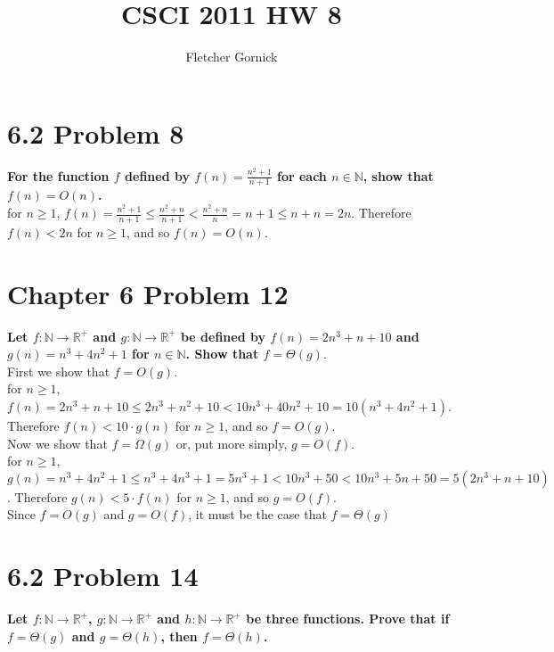 \documentclass[10pt]{article}
\title{CSCI 2011 HW 8}
\author{Fletcher Gornick}
\begin{document}
\maketitle


\section{6.2 Problem 8}
\textbf{For the function $f$ defined by $f(n) = \frac{n^2+1}{n+1}$ for each $n \in \mathbb{N}$, show that $f(n) = O(n)$.} \\

for $n \geq 1$,
$f(n) = \frac{n^2+1}{n+1} \leq \frac{n^2+n}{n+1} < \frac{n^2+n}{n} = n + 1 \leq n + n = 2n$.  Therefore $f(n) < 2n$ for $n \geq 1$, and so $f(n) = O(n)$.



\section{Chapter 6 Problem 12}
\textbf{Let $f: \mathbb{N} \to \mathbb{R}^+$ and $g: \mathbb{N} \to \mathbb{R}^+$ be defined by $f(n) = 2n^3 + n + 10$ and $g(n) = n^3 + 4n^2 + 1$
for $n \in \mathbb{N}$.  Show that $f = \Theta(g)$}. \\

First we show that $f = O(g)$. \\
for $n \geq 1$, $f(n) = 2n^3 + n + 10 \leq 2n^3 + n^2 + 10 < 10n^3 + 40n^2 + 10 = 10(n^3 + 4n^2 + 1)$.  Therefore $f(n) < 10 \cdot g(n)$ for $n \geq 1$, and so
$f = O(g)$. \\

Now we show that $f = \Omega(g)$ or, put more simply, $g = O(f)$. \\
for $n \geq 1$, $g(n) = n^3 + 4n^2 + 1 \leq n^3 + 4n^3 + 1 = 5n^3 + 1 < 10n^3 + 50 < 10n^3 + 5n + 50 = 5(2n^3 + n + 10)$.  Therefore $g(n) < 5 \cdot f(n)$ for
$n \geq 1$, and so $g = O(f)$. \\

Since $f = O(g)$ and $g = O(f)$, it must be the case that $f = \Theta(g)$



\section{6.2 Problem 14}
\textbf{Let $f: \mathbb{N} \to \mathbb{R}^+$, $g: \mathbb{N} \to \mathbb{R}^+$ and $h: \mathbb{N} \to \mathbb{R}^+$ be three functions.  Prove that
if $f = \Theta(g)$ and $g = \Theta(h)$, then $f = \Theta(h)$.} \\
\end{document}
